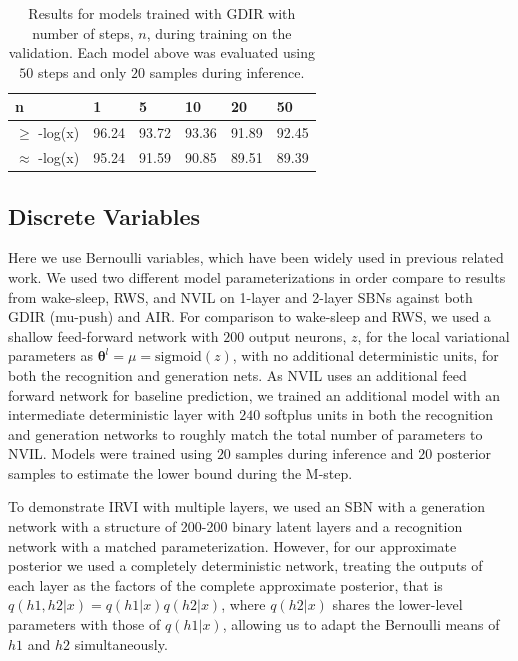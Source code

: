 \documentclass{article} %
\newcommand{\vects}[1]{\boldsymbol{#1}}
\newcommand{\TT}[0]{\vects{\theta}}
\newcommand{\sigmoid}{\text{sigmoid}}
\begin{document}
\begin{minipage}{\textwidth}
\begin{minipage}[r]{0.43\textwidth}
        \label{fig:continuous}
        \end{minipage}
\end{minipage}

\begin{table}
\begin{tabular}{ | m{1.4cm} | m{1cm} | m{1cm} | m{1cm} | m{1cm} | m{1cm} |}
\hline
n & 1 & 5 & 10 & 20 & 50 \\
\hline
$\ge$ -log(x) & 96.24 & 93.72 & 93.36 & 91.89 & 92.45\\
\hline
$\approx$ -log(x) & 95.24 & 91.59 & 90.85 & 89.51 & 89.39 \\
\hline
\end{tabular}
\caption{Results for models trained with GDIR with number of steps, $n$, during training on the validation. Each model above was evaluated using $50$ steps and only $20$ samples during inference.}
\label{table:cont_step}
\end{table}

\subsection{Discrete Variables}
Here we use Bernoulli variables, which have been widely used in previous related work. We used two different model parameterizations in order compare to results from wake-sleep, RWS, and NVIL on 1-layer and 2-layer SBNs against both GDIR (mu-push) and AIR. For comparison to wake-sleep and RWS, we used a shallow
feed-forward network with $200$ output neurons, $z$, for the local variational parameters as $\TT^l = \mu = \sigmoid(z)$, with no additional deterministic units, for both the recognition and generation nets.
As NVIL uses an additional feed forward network for baseline prediction, we trained an additional model with
an intermediate deterministic layer with $240$ softplus units in both the recognition and generation
networks to roughly match the total number of parameters to NVIL. Models
were trained using $20$ samples during inference and $20$ posterior samples to estimate the lower bound during the
M-step.

To demonstrate IRVI with multiple layers, we used an SBN with a generation network with a structure of 200-200 binary latent layers and a recognition network with a matched parameterization. However, for our approximate posterior we used a completely deterministic network, treating the outputs of each layer as the factors of the complete approximate posterior, that is $q(h1, h2 | x) = q(h1|x) q(h2|x)$, where $q(h2|x)$ shares the lower-level parameters with those of $q(h1|x)$, allowing us to adapt the Bernoulli means of $h1$ and $h2$ simultaneously.
\end{document}
